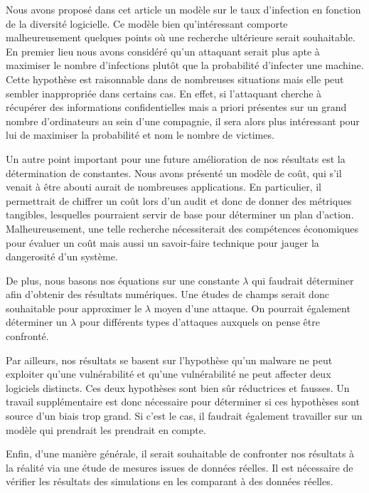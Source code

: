 Nous avons proposé dans cet article un modèle sur le taux d'infection en fonction de la diversité logicielle. Ce modèle bien
qu'intéressant comporte malheureusement quelques points où une recherche ultérieure serait souhaitable. En premier lieu nous avons
considéré qu'un attaquant serait plus apte à maximiser le nombre d'infections plutôt que la probabilité d'infecter une machine.
Cette hypothèse est raisonnable dans de nombreuses situations mais elle peut sembler inappropriée dans certains cas. En effet, si
l'attaquant
cherche à récupérer des informations confidentielles mais a priori présentes sur un grand nombre d'ordinateurs au sein d'une
compagnie, il sera alors plus intéressant pour lui de maximiser la probabilité et nom le nombre de victimes.
\newline

Un autre point important pour une future amélioration de nos résultats est la détermination de constantes. Nous avons présenté un
modèle de coût, qui s'il venait à être abouti aurait de nombreuses applications. En particulier, il permettrait de chiffrer un
coût lors d'un audit et donc de donner des métriques tangibles, lesquelles pourraient servir de base pour déterminer un plan
d'action. Malheureusement, une telle recherche nécessiterait des compétences économiques pour évaluer un coût mais aussi un
savoir-faire technique pour jauger la dangerosité d'un système.
\newline

De plus, nous basons nos équations sur une constante $\lambda$ qui faudrait déterminer afin d'obtenir des résultats numériques. Une
études de champs serait donc souhaitable pour approximer le $\lambda$ moyen d'une attaque. On pourrait également déterminer un
$\lambda$ pour différents types d'attaques auxquels on pense être confronté.
\newline

Par ailleurs, nos résultats se basent sur l'hypothèse qu'un malware ne peut exploiter qu'une vulnérabilité et qu'une vulnérabilité
ne peut affecter deux logiciels distincts. Ces deux hypothèses sont bien sûr réductrices et fausses. Un travail supplémentaire est
donc nécessaire pour déterminer si ces hypothèses sont source d'un biais trop grand. Si c'est le cas, il faudrait également
travailler sur un modèle qui prendrait les prendrait en compte.

Enfin, d'une manière générale, il serait souhaitable de confronter nos résultats à la réalité via une étude de mesures issues de
données réelles. Il est nécessaire de vérifier les résultats des simulations en les comparant à des données réelles. 
